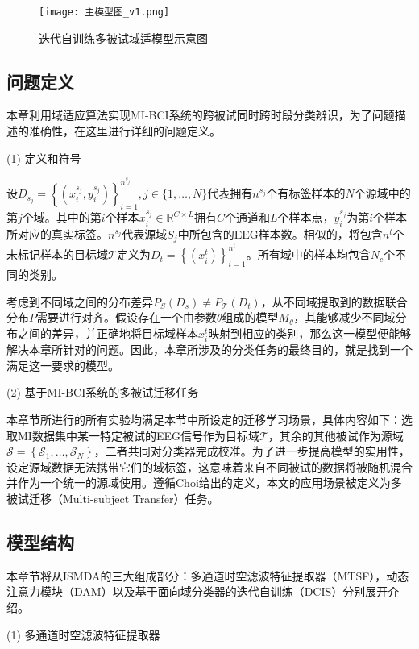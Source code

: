 \begin{figure}[!t]
\centering
\texttt{[image: 主模型图\_v1.png]}
\caption{迭代自训练多被试域适模型示意图}
\label{fig_4_1}
\end{figure}

\subsection{问题定义}
本章利用域适应算法实现MI-BCI系统的跨被试同时跨时段分类辨识，为了问题描述的准确性，在这里进行详细的问题定义。

(1) 定义和符号

设$D_{s_{j}}=\left\{\left(x_{i}^{s_{j}}, y_{i}^{s_{j}}\right)\right\}_{i=1}^{n^{s_{j}}}, j \in\{1, \ldots, N\}$代表拥有${n^{s_{j}}}$个有标签样本的$N$个源域中的第$j$个域。其中的第$i$个样本$x_{i}^{s_{j}} \in \mathbb{R}^{C \times L}$拥有$C$个通道和$L$个样本点，${y_{i}^{s_{j}}}$为第$i$个样本所对应的真实标签。${n^{s_{j}}}$代表源域$S_{j}$中所包含的EEG样本数。相似的，将包含${n^{t}}$个未标记样本的目标域$\mathcal{T}$定义为$D_{t}=\left\{\left(x_{i}^{t}\right)\right\}_{i=1}^{n^{t}}$。所有域中的样本均包含$N_{c}$个不同的类别。

考虑到不同域之间的分布差异$P_{S}\left(D_{s}\right) \neq P_{\mathcal{T}}\left(D_{t}\right)$，从不同域提取到的数据联合分布$P$需要进行对齐。假设存在一个由参数$\theta$组成的模型$M_{\theta}$，其能够减少不同域分布之间的差异，并正确地将目标域样本$x_{i}^{t}$映射到相应的类别，那么这一模型便能够解决本章所针对的问题。因此，本章所涉及的分类任务的最终目的，就是找到一个满足这一要求的模型。

(2) 基于MI-BCI系统的多被试迁移任务

本章节所进行的所有实验均满足本节中所设定的迁移学习场景，具体内容如下：选取MI数据集中某一特定被试的EEG信号作为目标域$\mathcal{T}$，其余的其他被试作为源域$\mathcal{S}=\left\{\mathcal{S}_{1}, \ldots, \mathcal{S}_{N}\right\}$，二者共同对分类器完成校准。为了进一步提高模型的实用性，设定源域数据无法携带它们的域标签，这意味着来自不同被试的数据将被随机混合并作为一个统一的源域使用。遵循Choi给出的定义\cite{4-1}，本文的应用场景被定义为多被试迁移（Multi-subject Transfer）任务。

\subsection{模型结构}
本章节将从ISMDA的三大组成部分：多通道时空滤波特征提取器（MTSF），动态注意力模块（DAM）以及基于面向域分类器的迭代自训练（DCIS）分别展开介绍。

(1) 多通道时空滤波特征提取器

